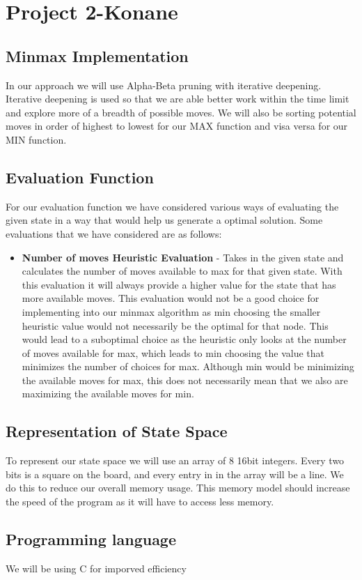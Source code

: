 \documentclass[12pt]{article}
\begin{document}
\section*{Project 2-Konane}

\subsection*{Minmax Implementation}
In our approach we will use Alpha-Beta pruning with iterative deepening.
Iterative deepening is used so that we are able better work within the time limit and explore more of a breadth of possible moves.
We will also be sorting potential moves in order of highest to lowest for our MAX function and visa versa for our MIN function.

\subsection*{Evaluation Function}
For our evaluation function we have considered various ways of evaluating the given state in a way that would help us generate a optimal solution. Some evaluations that we have considered are as follows:
\begin{itemize}
\item \textbf{Number of moves Heuristic Evaluation} - 
Takes in the given state and calculates the number of moves available to max for that given state. 
With this evaluation it will always provide a higher value for the state that has more available moves. 
This evaluation would not be a good choice for implementing into our minmax algorithm as min choosing the smaller heuristic value would not necessarily be the optimal for that node. 
This would lead to a suboptimal choice as the heuristic only looks at the number of moves available for max, which leads to min choosing the value that minimizes the number of choices for max. 
Although min would be minimizing the available moves for max, this does not necessarily mean that we also are maximizing the available moves for min.

\end{itemize}
\subsection*{Representation of State Space}
To represent our state space we will use an array of 8 16bit integers.
Every two bits is a square on the board, and every entry in in the array will be a line.
We do this to reduce our overall memory usage.
This memory model should increase the speed of the program as it will have to access less memory.

\subsection*{Programming language}
We will be using C for imporved efficiency
\end{document}
